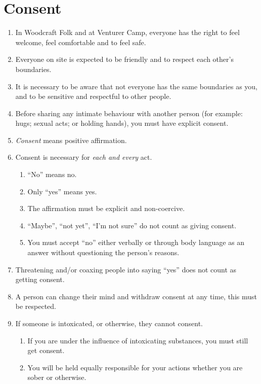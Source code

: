 \documentclass[a4paper, 11pt]{report}
\begin{document}
    \chapter{Consent}
    \begin{enumerate}
        \item In Woodcraft Folk and at Venturer Camp, everyone has the right to feel welcome, feel comfortable and to feel safe.
        \item Everyone on site is expected to be friendly and to respect each other's boundaries.
        \item It is necessary to be aware that not everyone has the same boundaries as you, and to be sensitive and respectful to other people.
        \item Before sharing any intimate behaviour with another person (for example: hugs; sexual acts; or holding hands), you must have explicit consent.
        \item \textit{Consent} means positive affirmation.
        \item Consent is necessary for \textit{each and every} act. 
        \begin{enumerate}
            \item ``No'' means no.
            \item Only ``yes'' means yes.
            \item The affirmation must be explicit and non-coercive.
            \item ``Maybe'', ``not yet'', ``I'm not sure'' do not count as giving consent.
            \item You must accept ``no'' either verbally or through body language as an answer without questioning the person's reasons.
        \end{enumerate}
        \item Threatening and/or coaxing people into saying ``yes'' does not count as getting consent.
        \item A person can change their mind and withdraw consent at any time, this must be respected.
        \item If someone is intoxicated, or otherwise, they cannot consent.
        \begin{enumerate}
            \item If you are under the influence of intoxicating substances, you must still get consent.
            \item You will be held equally responsible for your actions whether you are sober or otherwise.

\end{enumerate}
\end{enumerate}
\end{document}
